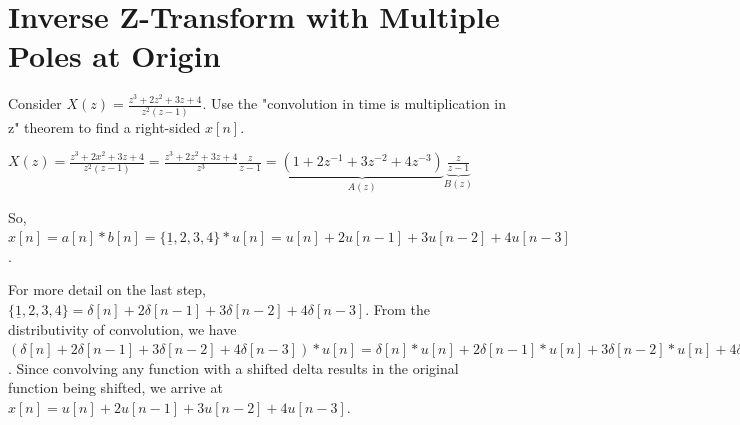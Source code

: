 \documentclass[11pt]{article}
\begin{document}
\section{Inverse Z-Transform with Multiple Poles at Origin}

Consider $X(z) = \frac{z^3+2z^2+3z+4}{z^2(z-1)}$. Use the "convolution in time is multiplication in z" theorem to find a right-sided $x[n]$.

{\color{blue}
$X(z) = \frac{z^3+2x^2+3z+4}{z^2(z-1)} =\frac{z^3+2z^2+3z+4}{z^3}\frac{z}{z-1}=\underbrace{\left(1+2z^{-1}+3z^{-2}+4z^{-3}\right)}_{A(z)} \underbrace{\frac{z}{z-1}}_{B(z)}$

So, $x[n]=a[n]*b[n] = \{\underline{1},2,3,4\}*u[n]= u[n]+2u[n-1]+3u[n-2]+4u[n-3]$.

For more detail on the last step, $\{\underline{1},2,3,4\} = \delta[n]+2\delta[n-1]+3\delta[n-2]+4\delta[n-3]$. From the distributivity of convolution, we have $\left(\delta[n]+2\delta[n-1]+3\delta[n-2]+4\delta[n-3] \right)*u[n] = \delta[n]*u[n]+2\delta[n-1]*u[n]+3\delta[n-2]*u[n]+4\delta[n-3]*u[n]$. Since convolving any function with a shifted delta results in the original function being shifted, we arrive at $x[n] = u[n]+2u[n-1]+3u[n-2]+4u[n-3]$.

}
\end{document}
